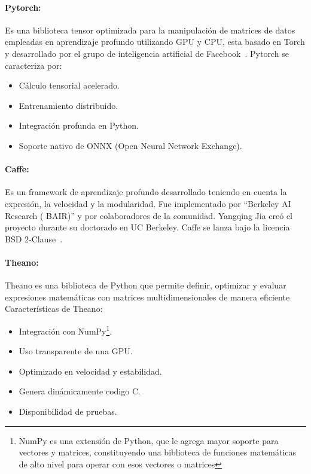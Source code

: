     \paragraph{Pytorch:} Es una biblioteca tensor optimizada para la manipulación de matrices de datos empleadas en aprendizaje profundo utilizando \gls{GPU} y \gls{CPU}, esta basado en Torch y desarrollado por el grupo de inteligencia artificial de Facebook~\cite{Paszke2016}.
    Pytorch se caracteriza por:
    \begin{itemize}
        \item Cálculo tensorial acelerado.
        \item Entrenamiento distribuido.
        \item Integración profunda en Python.
        \item Soporte nativo de ONNX (Open Neural Network Exchange).
    \end{itemize}
    
    \paragraph{Caffe:} Es un framework de aprendizaje profundo desarrollado teniendo en cuenta la expresión, la velocidad y la modularidad. Fue implementado por ``Berkeley AI Research ( BAIR)'' y por colaboradores de la comunidad. Yangqing Jia creó el proyecto durante su doctorado en UC Berkeley. Caffe se lanza bajo la licencia BSD 2-Clause~\cite{Jia2015}.
   
    \paragraph{Theano:} Theano es una biblioteca de Python que permite definir, optimizar y evaluar expresiones matemáticas con matrices multidimensionales de manera eficiente~\cite{Theano2011} Características de Theano:
    \begin{itemize}
        \item Integración con NumPy\footnote{NumPy es una extensión de Python, que le agrega mayor soporte para vectores y matrices, constituyendo una biblioteca de funciones matemáticas de alto nivel para operar con esos vectores o matrices}.
        \item Uso transparente de una \gls{GPU}.
        \item Optimizado en velocidad y estabilidad.
        \item Genera dinámicamente codigo C.
        \item Disponibilidad de pruebas.
    \end{itemize}



